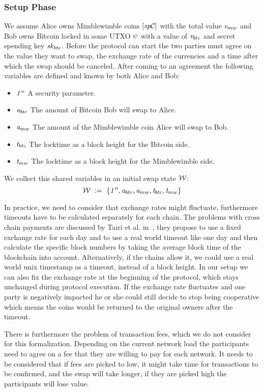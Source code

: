 \subsubsection{Setup Phase}\label{subsec:atom:setup}

We assume Alice owns Mimblewimble coins $[\mathit{sp}\mathcal{C}]$ with the total value $\mathit{v}_{mw}$ and Bob owns
Bitcoin locked in some UTXO $\psi$ with a value of $\mathit{v}_{btc}$ and secret spending key $\mathit{sk}_{btc}$.
Before the protocol can start the two parties must agree on the value they want to swap, the exchange rate of the currencies and a time after which the swap should be canceled.
After coming to an agreement the following variables are defined and known by both Alice and Bob:
\begin{itemize}
    \item $\mathit{1^n}$ A security parameter.
    \item $\mathit{a}_{btc}$ The amount of Bitcoin Bob will swap to Alice.
    \item $\mathit{a}_{mw}$ The amount of the Mimblewimble coin Alice will swap to Bob.
    \item $\mathit{t}_{btc}$ The locktime as a block height for the Bitcoin side.
    \item $\mathit{t}_{mw}$ The locktime as a block height for the Mimblewimble side.
\end{itemize}
We collect this shared variables in an initial swap state $\mathcal{W}$:
\[ \mathcal{W} ~:=~ \{ \mathit{1^n}, \mathit{a}_{btc}, \mathit{a}_{mw}, \mathit{t}_{btc}, \mathit{t}_{mw} \} \]

In practice, we need to consider that exchange rates might fluctuate, furthermore timeouts have to be calculated separately for each chain.
The problems with cross chain payments are discussed by Tairi et al. in~\cite{tairi2019a2l}, they propose to use a fixed exchange rate for each day and to use a real world timeout like one day and then calculate the specific block numbers by taking the average block time of the blockchain into account.
Alternatively, if the chains allow it, we could use a real world unix timestamp as a timeout, instead of a block height.
In our setup we can also fix the exchange rate at the beginning of the protocol, which stays unchanged during protocol execution.
If the exchange rate fluctuates and one party is negatively impacted he or she could still decide to stop being cooperative which means the coins would be returned to the original owners after the timeout.

There is furthermore the problem of transaction fees, which we do not consider for this formalization.
Depending on the current network load the participants need to agree on a fee that they are willing to pay for each network.
It needs to be considered that if fees are picked to low, it might take time for transactions to be confirmed, and the swap will take longer, if they are picked high the participants will lose value.

